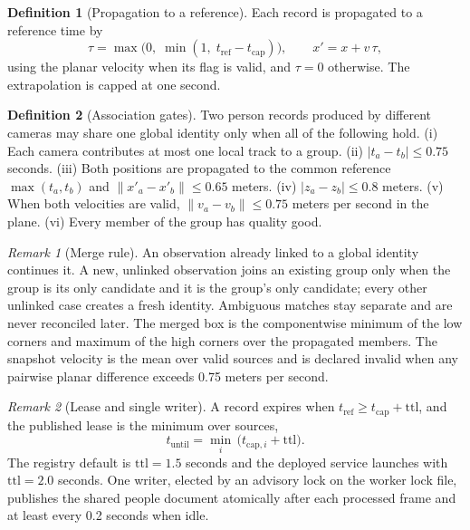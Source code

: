 \documentclass[10pt,a4paper]{article}
\theoremstyle{plain}
\theoremstyle{definition}
\newtheorem{definition}{Definition}[section]
\theoremstyle{remark}
\newtheorem{remark}{Remark}[section]
\begin{document}
\begin{definition}[Propagation to a reference]\label{def:prop}
Each record is propagated to a reference time by
\begin{equation}
\tau = \max\bigl(0,\; \min(1,\; t_{\mathrm{ref}} - t_{\mathrm{cap}})\bigr), \qquad x' = x + v\,\tau,
\end{equation}
using the planar velocity when its flag is valid, and $\tau = 0$ otherwise. The extrapolation is capped at one second.
\end{definition}

\begin{definition}[Association gates]\label{prop:fusegates}
Two person records produced by different cameras may share one global identity only when all of the following hold.
(i) Each camera contributes at most one local track to a group.
(ii) $|t_a - t_b| \le 0.75$ seconds.
(iii) Both positions are propagated to the common reference $\max(t_a, t_b)$ and $\|x'_a - x'_b\| \le 0.65$ meters.
(iv) $|z_a - z_b| \le 0.8$ meters.
(v) When both velocities are valid, $\|v_a - v_b\| \le 0.75$ meters per second in the plane.
(vi) Every member of the group has quality good.
\end{definition}

\begin{remark}[Merge rule]\label{rem:merge}
An observation already linked to a global identity continues it. A new, unlinked observation joins an existing group only when the group is its only candidate and it is the group's only candidate; every other unlinked case creates a fresh identity. Ambiguous matches stay separate and are never reconciled later. The merged box is the componentwise minimum of the low corners and maximum of the high corners over the propagated members. The snapshot velocity is the mean over valid sources and is declared invalid when any pairwise planar difference exceeds 0.75 meters per second.
\end{remark}

\begin{remark}[Lease and single writer]\label{rem:writer}
A record expires when $t_{\mathrm{ref}} \ge t_{\mathrm{cap}} + \mathrm{ttl}$, and the published lease is the minimum over sources,
\begin{equation}
t_{\mathrm{until}} = \min_i\,\bigl(t_{\mathrm{cap},i} + \mathrm{ttl}\bigr).
\end{equation}
The registry default is $\mathrm{ttl} = 1.5$ seconds and the deployed service launches with $\mathrm{ttl} = 2.0$ seconds. One writer, elected by an advisory lock on the worker lock file, publishes the shared people document atomically after each processed frame and at least every 0.2 seconds when idle.
\end{remark}
\end{document}
